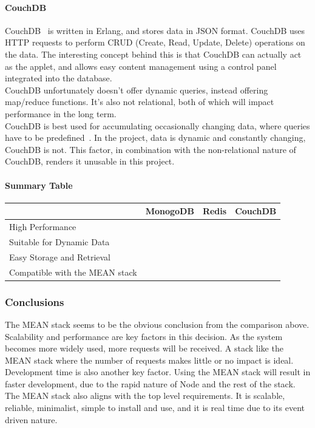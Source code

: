 \documentclass[preprint,12pt,3p]{elsarticle}
\newcommand{\checkmark}{\ding{51}}%
\newcommand{\xmark}{\ding{55}}%
\begin{document}
\paragraph{CouchDB}
CouchDB~\cite{couchdb} is written in Erlang, and stores data in JSON format. CouchDB uses HTTP requests to perform CRUD (Create, Read, Update, Delete) operations on the data. 
The interesting concept behind this is that CouchDB can actually act as the applet, and allows easy content management using a control panel integrated into the database.\\
CouchDB unfortunately doesn't offer dynamic queries, instead offering map/reduce functions. It's also not relational, both of which will impact performance in the long term.\\
CouchDB is best used for accumulating occasionally changing data, where queries have to be predefined~\cite{databasecomparison}. In the project, data is dynamic and constantly changing, CouchDB is not. This factor, in combination with the non-relational nature of CouchDB, renders it unusable in this project.

\paragraph{Summary Table}
\begin{tabular}{| l | l | l | l |}
    \hline
          & MonogoDB & Redis & CouchDB \\ \hline
    High Performance & \checkmark & \checkmark & \xmark\\ \hline
    Suitable for Dynamic Data & \checkmark & \checkmark & \xmark\\ \hline
    Easy Storage and Retrieval & \checkmark & \xmark & \checkmark\\ \hline
    Compatible with the MEAN stack & \checkmark & \checkmark & \checkmark\\ \hline
\end{tabular}

\subsubsection{Conclusions}
The MEAN stack seems to be the obvious conclusion from the comparison above. Scalability and performance are key factors in this decision. As the system becomes more widely used, more requests will be received. A stack like the MEAN stack where the number of requests makes little or no impact is ideal.\\
Development time is also another key factor. Using the MEAN stack will result in faster development, due to the rapid nature of Node and the rest of the stack.\\
The MEAN stack also aligns with the top level requirements. It is scalable, reliable, minimalist, simple to install and use, and it is real time due to its event driven nature.
\end{document}

